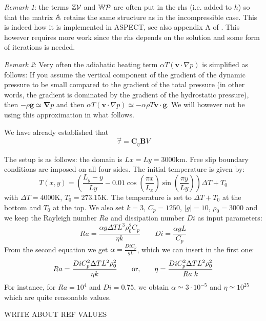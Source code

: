 {\sl Remark 1}: the terms ${\mathbb{Z}} {\cal V}$ and ${\mathbb{W}} {\cal P}$ are 
often put in the rhs (i.e. added to $h$) so that 
the matrix ${\mathbb{A}}$ retains the same structure as in the incompressible case. This is indeed 
how it is implemented in ASPECT, see also appendix A of \cite{lezh08}. This however requires more work since the rhs depends 
on the solution and some form of iterations is needed. 

{\sl Remark 2}: Very often the adiabatic heating term  
$\alpha T \left( \bm v \cdot \nabla p \right)$ is simplified as follows:
If you assume the vertical component of the gradient of the dynamic pressure to be small compared to the
gradient of the total pressure (in other words, the gradient is dominated by the gradient of the hydrostatic
pressure), then $-\rho {\bm g} \simeq {\bm \nabla}p$ and then 
$\alpha T \left( \bm v \cdot \nabla p \right) \simeq  -\alpha\rho T {\bm v}\cdot{\bm g}$. We will however 
not be using this approximation in what follows.



We have already established that
\[
\vec{\tau} = {\bm C}_\eta {\bm B} V
\]




\newpage
The setup is as follows: the domain is $Lx=Ly=3000$km. Free slip boundary conditions are imposed on all four sides. 
The initial temperature is given by:
\[
T(x,y) = \left(  \frac{L_y-y}{Ly} - 0.01\cos(\frac{\pi x}{L_x}) \sin(\frac{\pi y}{Ly}) \right) \Delta T + T_0
\]
with $\Delta T=4000$K, $T_0=273.15$K. The temperature is set to $\Delta T + T_0$ at the bottom and $T_0$ at the top.
We also set $k=3$, $C_p=1250$, $|g|=10$, $\rho_0=3000$ and we keep the Rayleigh number $Ra$ and dissipation number $Di$ as input parameters:
\[
Ra=\frac{\alpha g \Delta T L^3 \rho_0^2 C_p}{\eta k}
\quad\quad
Di=\frac{\alpha g L}{C_p}
\]
From the second equation we get $\alpha=\frac{Di C_p}{g L}$, which we can insert in the first one:
\[
Ra=\frac{Di C_p^2 \Delta T L^2 \rho_0^2 }{\eta k}
\quad\quad
{\rm or,}
\quad\quad
\eta=
\frac{Di C_p^2 \Delta T L^2 \rho_0^2 }{Ra \; k  }
\]
For instance, for $Ra=10^4$ and $Di=0.75$, we obtain $\alpha\simeq 3\cdot 10^{-5}$ and $\eta\simeq 10^{25}$ 
which are quite reasonable values. 



{\color{red} WRITE ABOUT REF VALUES }






